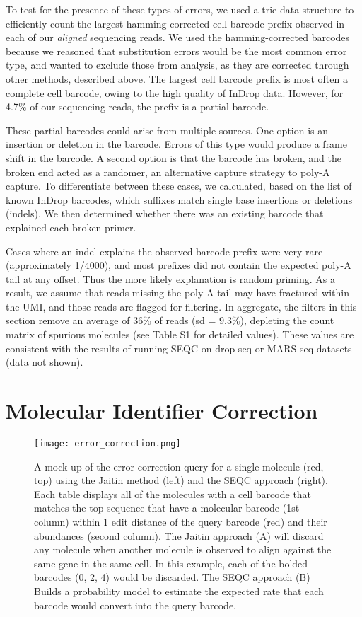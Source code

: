 To test for the presence of these types of errors, we used a {\mono trie} data structure to efficiently count the largest hamming-corrected cell barcode prefix observed in each of our \textit{aligned} sequencing reads. 
We used the hamming-corrected barcodes because we reasoned that substitution errors would be the most common error type, and wanted to exclude those from analysis, as they are corrected through other methods, described above. 
The largest cell barcode prefix is most often a complete cell barcode, owing to the high quality of InDrop data. 
However, for 4.7\% of our sequencing reads, the prefix is a partial barcode.  

These partial barcodes could arise from multiple sources. 
One option is an insertion or deletion in the barcode. 
Errors of this type would produce a frame shift in the barcode. 
A second option is that the barcode has broken, and the broken end acted as a randomer, an alternative capture strategy to poly-A capture. 
To differentiate between these cases, we calculated, based on the list of known InDrop barcodes, which suffixes match single base insertions or deletions (indels). 
We then determined whether there was an existing barcode that explained each broken primer. 

Cases where an indel explains the observed barcode prefix were very rare (approximately 1/4000), and most prefixes did not contain the expected poly-A tail at any offset. 
Thus the more likely explanation is random priming. 
As a result, we assume that reads missing the poly-A tail may have fractured within the UMI, and those reads are flagged for filtering. 
In aggregate, the filters in this section remove an average of 36\% of reads (sd = 9.3\%), depleting the count matrix of spurious molecules (see Table S1 for detailed values). %
These values are consistent with the results of running SEQC on drop-seq or MARS-seq datasets (data not shown).

\section{Molecular Identifier Correction}

\begin{figure}
\centering
\texttt{[image: error\_correction.png]}
\caption{A mock-up of the error correction query for a single molecule (red, top) using the Jaitin method (left) and the SEQC approach (right).
  Each table displays all of the molecules with a cell barcode that matches the top sequence that have a molecular barcode (1st column) within 1 edit distance of the query barcode (red) and their abundances (second column). 
  The Jaitin approach (A) will discard any molecule when another molecule is observed to align against the same gene in the same cell. In this example, each of the bolded barcodes (0, 2, 4) would be discarded.  
The SEQC approach (B) Builds a probability model to estimate the expected rate that each barcode would convert into the query barcode.}
\label{fig:error-correction}
\end{figure}


